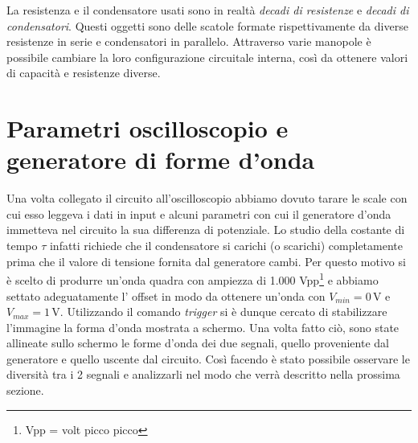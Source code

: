 La resistenza e il condensatore usati sono in realtà \textit{decadi di resistenze} e \textit{decadi di condensatori}. Questi oggetti sono delle scatole formate rispettivamente da diverse resistenze in serie e condensatori in parallelo. Attraverso varie manopole è possibile cambiare la loro configurazione circuitale interna, così da ottenere valori di capacità e resistenze diverse. 

\section{Parametri oscilloscopio e generatore di forme d'onda}

Una volta collegato il circuito all'oscilloscopio abbiamo dovuto tarare le scale con cui esso leggeva i dati in input e alcuni parametri con cui il generatore d'onda immetteva nel circuito la sua differenza di potenziale. Lo studio della costante di tempo $\tau$ infatti richiede che il condensatore si carichi (o scarichi) completamente prima che il valore di tensione fornita dal generatore cambi. Per questo motivo si è scelto di produrre un'onda quadra con ampiezza di 1.000 Vpp\footnote{Vpp = volt picco picco} e abbiamo settato adeguatamente l' offset %
in modo da ottenere un'onda con $V_{min}=0\,\si{\volt}$ e $V_{max}=1\,\si{\volt}$. Utilizzando il comando \textit{trigger} si è dunque cercato di stabilizzare l'immagine la forma d'onda mostrata a schermo. Una volta fatto ciò, sono state allineate sullo schermo le forme d'onda dei due segnali, quello proveniente dal generatore e quello uscente dal circuito. Così facendo è stato possibile osservare le diversità tra i 2 segnali e analizzarli nel modo che verrà descritto nella prossima sezione.
 